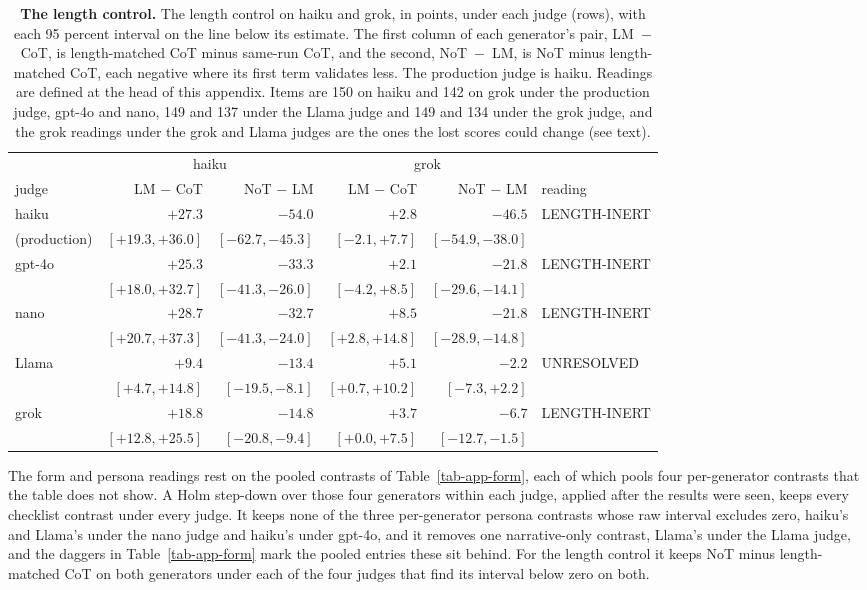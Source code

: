 \begin{table}[tp]
\centering
\small
\caption{\textbf{The length control.} The length control on haiku and grok, in points, under each judge
(rows), with each 95 percent interval on the line below its estimate. The
first column of each generator's pair, LM~$-$~CoT, is length-matched CoT minus
same-run CoT, and the second, NoT~$-$~LM, is NoT minus length-matched CoT,
each negative where its first term validates less. The production judge is
haiku. Readings are defined at the head of this appendix. Items are 150 on haiku and 142 on grok
under the production judge, gpt-4o and nano, 149 and 137 under the Llama
judge and 149 and 134 under the grok judge, and the grok readings under the
grok and Llama judges are the ones the lost scores could change (see text).}
\label{tab-app-length}
{\footnotesize
\setlength{\tabcolsep}{4pt}\begin{tabular}{@{}lrrrrl@{}}
\toprule
 & \multicolumn{2}{c}{haiku} & \multicolumn{2}{c}{grok} & \\
\cmidrule(lr){2-3}\cmidrule(lr){4-5}
judge & LM $-$ CoT & NoT $-$ LM & LM $-$ CoT & NoT $-$ LM & reading \\
\midrule
haiku & $+27.3$ & $-54.0$ & $+2.8$ & $-46.5$ & LENGTH-INERT \\
(production) & $[+19.3, +36.0]$ & $[-62.7, -45.3]$ & $[-2.1, +7.7]$ & $[-54.9, -38.0]$ & \\[1pt]
gpt-4o & $+25.3$ & $-33.3$ & $+2.1$ & $-21.8$ & LENGTH-INERT \\
 & $[+18.0, +32.7]$ & $[-41.3, -26.0]$ & $[-4.2, +8.5]$ & $[-29.6, -14.1]$ & \\[1pt]
nano & $+28.7$ & $-32.7$ & $+8.5$ & $-21.8$ & LENGTH-INERT \\
 & $[+20.7, +37.3]$ & $[-41.3, -24.0]$ & $[+2.8, +14.8]$ & $[-28.9, -14.8]$ & \\[1pt]
Llama & $+9.4$ & $-13.4$ & $+5.1$ & $-2.2$ & UNRESOLVED \\
 & $[+4.7, +14.8]$ & $[-19.5, -8.1]$ & $[+0.7, +10.2]$ & $[-7.3, +2.2]$ & \\[1pt]
grok & $+18.8$ & $-14.8$ & $+3.7$ & $-6.7$ & LENGTH-INERT \\
 & $[+12.8, +25.5]$ & $[-20.8, -9.4]$ & $[+0.0, +7.5]$ & $[-12.7, -1.5]$ & \\[1pt]
\bottomrule
\end{tabular}}
\end{table}

The form and persona readings rest on the pooled contrasts of
Table~\ref{tab-app-form}, each of which pools four per-generator contrasts
that the table does not show. A Holm step-down over those four generators
within each judge, applied after the results were seen, keeps every
checklist contrast under every judge. It keeps none of the three
per-generator persona contrasts whose raw interval excludes zero, haiku's and
Llama's under the nano judge and haiku's under gpt-4o, and it removes one
narrative-only contrast, Llama's under the Llama judge, and the daggers in
Table~\ref{tab-app-form} mark the pooled entries these sit behind. For the
length control it keeps NoT minus length-matched CoT on both generators under
each of the four judges that find its interval below zero on both.

